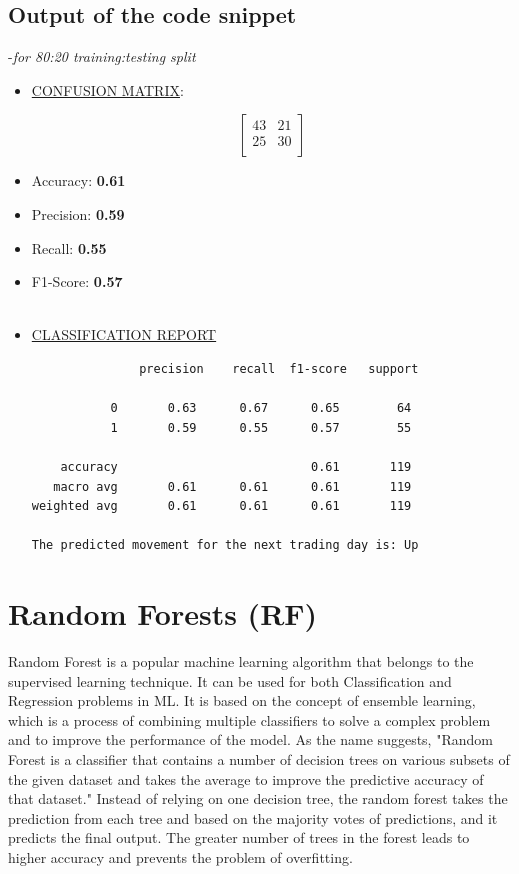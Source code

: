 \documentclass[12pt,a4paper]{report}
\begin{document}
\section{Output of the code snippet}-\textit{for 80:20 training:testing split}
\begin{itemize}
    \item \underline{CONFUSION MATRIX}:
    \vspace{-0.5cm}
    \begin{flushleft}
    \[
    \begin{bmatrix}
        43 & 21 \\
        25 & 30 \\
    \end{bmatrix}
    \]
    \end{flushleft}
    \vspace{-0.5cm} %

    \item Accuracy: \textbf{0.61}
    \item Precision: \textbf{0.59}
    \item Recall: \textbf{0.55}
    \item F1-Score: \textbf{0.57}
\\
\\
    \item \underline{CLASSIFICATION REPORT}
\begin{verbatim}
               precision    recall  f1-score   support

           0       0.63      0.67      0.65        64
           1       0.59      0.55      0.57        55

    accuracy                           0.61       119
   macro avg       0.61      0.61      0.61       119
weighted avg       0.61      0.61      0.61       119

The predicted movement for the next trading day is: Up
\end{verbatim}
\end{itemize}

\chapter{Random Forests (RF)}
Random Forest is a popular machine learning algorithm that belongs to the supervised learning technique. It can be used for both Classification and Regression problems in ML. It is based on the concept of ensemble learning, which is a process of combining multiple classifiers to solve a complex problem and to improve the performance of the model.
As the name suggests, "Random Forest is a classifier that contains a number of decision trees on various subsets of the given dataset and takes the average to improve the predictive accuracy of that dataset." Instead of relying on one decision tree, the random forest takes the prediction from each tree and based on the majority votes of predictions, and it predicts the final output.
The greater number of trees in the forest leads to higher accuracy and prevents the problem of overfitting. \cite{javatpoint_rf}
\\
\\
\end{document}
